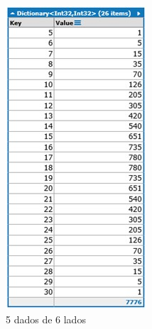 \begin{apendicesenv}
\begin{figure}[H]
\centering
	\begin{subfigure}[H]{0.47\linewidth}
	\centering
	\includegraphics[width=.7\linewidth]{sections/images/Distribution_PROB_5_6.jpg}
	\caption{5 dados de 6 lados}
	\label{fig:Distribution_PROB_5_6}
	\end{subfigure}
\hfill
	\begin{subfigure}[H]{0.47\linewidth}
	\centering

\end{subfigure}
\end{figure}
\end{apendicesenv}
